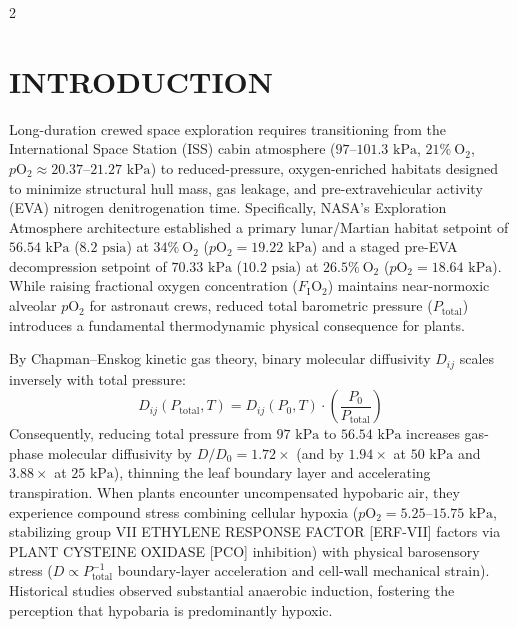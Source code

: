 \documentclass[10pt,a4paper]{article}
\begin{document}
\begin{multicols}{2}

\section*{INTRODUCTION}
Long-duration crewed space exploration requires transitioning from the International Space Station (ISS) cabin atmosphere ($97\text{--}101.3\text{ kPa}$, $21\%\ \text{O}_2$, $p\text{O}_2 \approx 20.37\text{--}21.27\text{ kPa}$) to reduced-pressure, oxygen-enriched habitats designed to minimize structural hull mass, gas leakage, and pre-extravehicular activity (EVA) nitrogen denitrogenation time\cite{norcross2013effects, paul2006spaceflight, zhou2017dissecting}. Specifically, NASA's Exploration Atmosphere architecture established a primary lunar/Martian habitat setpoint of $56.54\text{ kPa}$ ($8.2\text{ psia}$) at $34\%\ \text{O}_2$ ($p\text{O}_2 = 19.22\text{ kPa}$) and a staged pre-EVA decompression setpoint of $70.33\text{ kPa}$ ($10.2\text{ psia}$) at $26.5\%\ \text{O}_2$ ($p\text{O}_2 = 18.64\text{ kPa}$)\cite{norcross2013effects}. While raising fractional oxygen concentration ($F_{\text{I}}\text{O}_2$) maintains near-normoxic alveolar $p\text{O}_2$ for astronaut crews, reduced total barometric pressure ($P_{\text{total}}$) introduces a fundamental thermodynamic physical consequence for plants.

By Chapman--Enskog kinetic gas theory, binary molecular diffusivity $D_{ij}$ scales inversely with total pressure:
\begin{equation}
D_{ij}(P_{\text{total}}, T) = D_{ij}(P_0, T) \cdot \left(\frac{P_0}{P_{\text{total}}}\right)
\end{equation}
Consequently, reducing total pressure from $97\text{ kPa}$ to $56.54\text{ kPa}$ increases gas-phase molecular diffusivity by $D/D_0 = 1.72\times$ (and by $1.94\times$ at $50\text{ kPa}$ and $3.88\times$ at $25\text{ kPa}$), thinning the leaf boundary layer and accelerating transpiration\cite{corey2002gaseous, richards2006growth, paul2004hypobaric, paul2017spaceflight, lucia2025physiological}. When plants encounter uncompensated hypobaric air, they experience compound stress combining cellular hypoxia ($p\text{O}_2 = 5.25\text{--}15.75\text{ kPa}$, stabilizing group VII ETHYLENE RESPONSE FACTOR [ERF-VII] factors via PLANT CYSTEINE OXIDASE [PCO] inhibition\cite{gibbs2011homeostatic, licausi2011oxygen, mustroph2009profiling}) with physical barosensory stress ($D \propto P_{\text{total}}^{-1}$ boundary-layer acceleration and cell-wall mechanical strain\cite{zhou2017dissecting}). Historical studies observed substantial anaerobic induction, fostering the perception that hypobaria is predominantly hypoxic.


\end{multicols}
\end{document}
